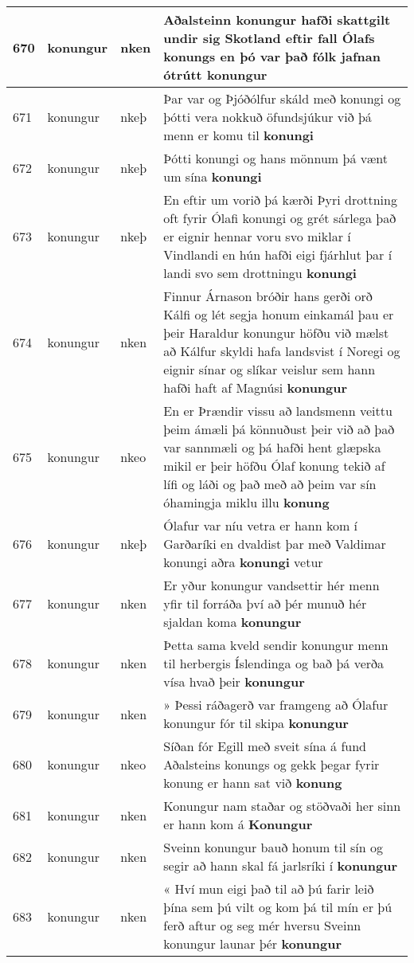 \documentclass{article}
\begin{document}
\begin{longtable}{p{1cm}|p{1cm}|p{1cm}|p{13cm}}
\hline
670&konungur&nken&Aðalsteinn konungur hafði skattgilt undir sig Skotland eftir fall Ólafs konungs en þó var það fólk jafnan ótrútt \textbf{konungur} \\
\hline
671&konungur&nkeþ&Þar var og Þjóðólfur skáld með konungi og þótti vera nokkuð öfundsjúkur við þá menn er komu til \textbf{konungi} \\
\hline
672&konungur&nkeþ&Þótti konungi og hans mönnum þá vænt um sína \textbf{konungi} \\
\hline
673&konungur&nkeþ&En eftir um vorið þá kærði Þyri drottning oft fyrir Ólafi konungi og grét sárlega það er eignir hennar voru svo miklar í Vindlandi en hún hafði eigi fjárhlut þar í landi svo sem drottningu \textbf{konungi} \\
\hline
674&konungur&nken&Finnur Árnason bróðir hans gerði orð Kálfi og lét segja honum einkamál þau er þeir Haraldur konungur höfðu við mælst að Kálfur skyldi hafa landsvist í Noregi og eignir sínar og slíkar veislur sem hann hafði haft af Magnúsi \textbf{konungur} \\
\hline
675&konungur&nkeo&En er Þrændir vissu að landsmenn veittu þeim ámæli þá könnuðust þeir við að það var sannmæli og þá hafði hent glæpska mikil er þeir höfðu Ólaf konung tekið af lífi og láði og það með að þeim var sín óhamingja miklu illu \textbf{konung} \\
\hline
676&konungur&nkeþ&Ólafur var níu vetra er hann kom í Garðaríki en dvaldist þar með Valdimar konungi aðra \textbf{konungi} vetur\\
\hline
677&konungur&nken&Er yður konungur vandsettir hér menn yfir til forráða því að þér munuð hér sjaldan koma \textbf{konungur} \\
\hline
678&konungur&nken&Þetta sama kveld sendir konungur menn til herbergis Íslendinga og bað þá verða vísa hvað þeir \textbf{konungur} \\
\hline
679&konungur&nken&» Þessi ráðagerð var framgeng að Ólafur konungur fór til skipa \textbf{konungur} \\
\hline
680&konungur&nkeo&Síðan fór Egill með sveit sína á fund Aðalsteins konungs og gekk þegar fyrir konung er hann sat við \textbf{konung} \\
\hline
681&konungur&nken&Konungur nam staðar og stöðvaði her sinn er hann kom á \textbf{Konungur} \\
\hline
682&konungur&nken&Sveinn konungur bauð honum til sín og segir að hann skal fá jarlsríki í \textbf{konungur} \\
\hline
683&konungur&nken&« Hví mun eigi það til að þú farir leið þína sem þú vilt og kom þá til mín er þú ferð aftur og seg mér hversu Sveinn konungur launar þér \textbf{konungur} \\

\end{longtable}
\end{document}
